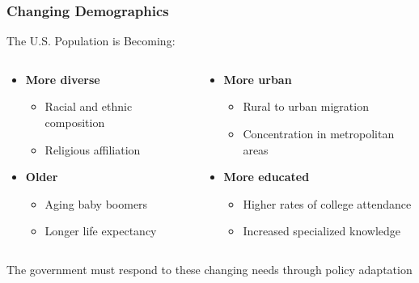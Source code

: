 \documentclass[10pt]{beamer}
\begin{document}
\begin{frame}
\frametitle{Changing Demographics}

\begin{block}{The U.S. Population is Becoming:}
\end{block}

\begin{columns}
\begin{column}{0.48\textwidth}
\pause
\begin{itemize}
\item \textbf{More diverse}
\begin{itemize}
\item Racial and ethnic composition
\item Religious affiliation
\end{itemize}
\item \textbf{Older}
\begin{itemize}
\item Aging baby boomers
\item Longer life expectancy
\end{itemize}
\end{itemize}
\end{column}

\begin{column}{0.48\textwidth}
\pause
\begin{itemize}
\item \textbf{More urban}
\begin{itemize}
\item Rural to urban migration
\item Concentration in metropolitan areas
\end{itemize}
\item \textbf{More educated}
\begin{itemize}
\item Higher rates of college attendance
\item Increased specialized knowledge
\end{itemize}
\end{itemize}
\end{column}
\end{columns}

\pause
\vspace{0.5cm}
\centering
The government must respond to these changing needs through policy adaptation

\end{frame}
\end{document}
